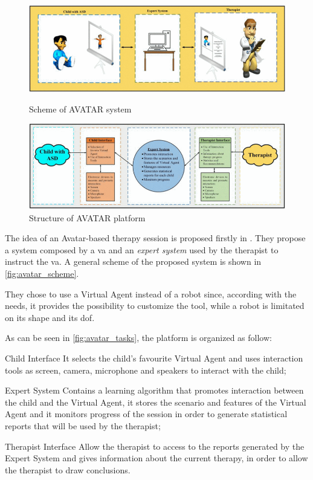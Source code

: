 \documentclass[12pt,journal,draftclsnofoot,onecolumn]{IEEEtran}
\begin{document}
\begin{figure}[h]
\centering

\begin{minipage}{0.48\textwidth}
\centering
\includegraphics[width=\textwidth]{avatar_system.png}
\caption{Scheme of AVATAR system}
\label{fig:avatar_scheme}
\end{minipage}
\begin{minipage}{0.48\textwidth}
\centering
\includegraphics[width=\textwidth]{avatar_tasks.png}
\caption{Structure of AVATAR platform}
\label{fig:avatar_tasks}
\end{minipage}

\end{figure}

The idea of an Avatar-based therapy session is proposed firstly in \cite{Guerrero-vasquez}. They propose a system composed by a \gls{va} and an \textit{expert system} used by the therapist to instruct the \gls{va}. A general scheme of the proposed system is shown in \autoref{fig:avatar_scheme}.

They chose to use a Virtual Agent instead of a robot since, according with the needs, it provides the possibility to customize the tool, while a robot is limitated on its shape and its \gls{dof}.

As can be seen in \autoref{fig:avatar_tasks}, the platform is organized as follow:
\begin{LaTeXdescription}
	\item[Child Interface] It selects the child's favourite Virtual Agent and uses interaction tools as screen, camera, microphone and speakers to interact with the child;
	\item[Expert System] Contains a learning algorithm that promotes interaction between the child and the Virtual Agent, it stores the scenario and features of the Virtual Agent and it monitors progress of the session in order to generate statistical reports that will be used by the therapist;
	\item[Therapist Interface] Allow the therapist to access to the reports generated by the Expert System and gives information about the current therapy, in order to allow the therapist to draw conclusions.
\end{LaTeXdescription}
\end{document}
